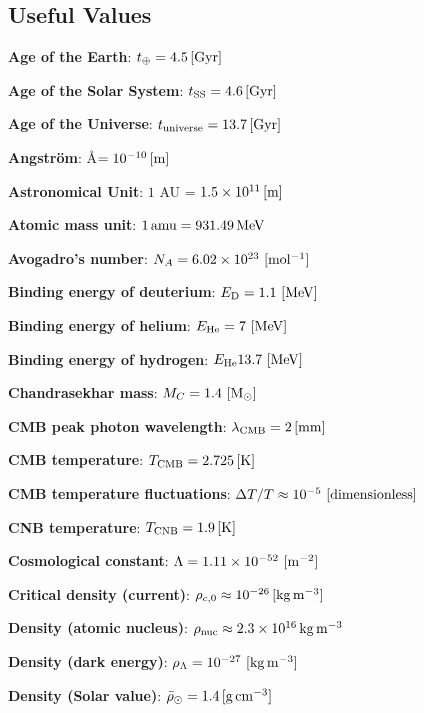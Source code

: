 \documentclass[a4paper,10pt]{article}
\begin{document}
\newpage
\subsection{Useful Values}

{\noindent}\textbf{Age of the Earth}: $t_\oplus = 4.5\,[{\rm Gyr}]$

{\noindent}\textbf{Age of the Solar System}: $t_\mathrm{SS} = 4.6\,[{\rm Gyr}]$

{\noindent}\textbf{Age of the Universe}: $t_\mathrm{universe} = 13.7\,[{\rm Gyr}]$

{\noindent}\textbf{Angstr\"{o}m}: \AA$ = 10^{-10}\,[{\rm m}]$

{\noindent}\textbf{Astronomical Unit}: $1$ AU = $1.5\times10^{11}\,[{\rm m}]$

{\noindent}\textbf{Atomic mass unit}: $1\,{\rm amu} = 931.49\,{\rm MeV}$

{\noindent}\textbf{Avogadro's number}: $N_A=6.02\times10^{23} ~ [{\rm mol^{-1}}]$

{\noindent}\textbf{Binding energy of deuterium}: $E_\mathrm{D} = 1.1 ~ [{\rm MeV}]$

{\noindent}\textbf{Binding energy of helium}: $E_\mathrm{He} = 7 ~ [{\rm MeV}]$

{\noindent}\textbf{Binding energy of hydrogen}: $E_\mathrm{He} 13.7 ~ [{\rm MeV}]$

{\noindent}\textbf{Chandrasekhar mass}: $M_C = 1.4 ~ [{\rm M_\odot}]$

{\noindent}\textbf{CMB peak photon wavelength}: $\lambda_\mathrm{CMB} = 2\,[{\rm mm}]$

{\noindent}\textbf{CMB temperature}: $T_\mathrm{CMB} = 2.725\,[{\rm K}]$

{\noindent}\textbf{CMB temperature fluctuations}: $\Delta T/T\approx10^{-5} ~ [{\rm dimensionless}]$

{\noindent}\textbf{CNB temperature}: $T_\mathrm{CNB} = 1.9\,[{\rm K}]$

{\noindent}\textbf{Cosmological constant}: $\Lambda=1.11\times10^{-52} ~ [{\rm m^{-2}}]$

{\noindent}\textbf{Critical density (current)}: $\rho_{c,0}\approx10^{-26}\,[{\rm kg\,m^{-3}}]$

{\noindent}\textbf{Density (atomic nucleus)}: $\rho_{\rm nuc} \approx 2.3\times10^{16}\,{\rm kg\,m^{-3}}$

{\noindent}\textbf{Density (dark energy)}: $\rho_\Lambda = 10^{-27} ~ [{\rm kg\,m^{-3}}]$

{\noindent}\textbf{Density (Solar value)}: $\bar{\rho}_\odot = 1.4\,[{\rm g\,cm^{-3}}]$
\end{document}
